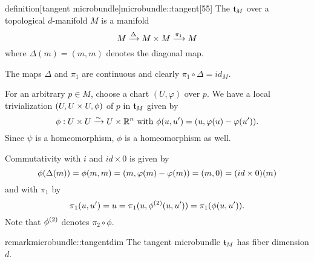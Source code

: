 \begin{mystatement}{definition}[tangent microbundle]{microbundle::tangent}[55]
    The  $\mathfrak{t}_M$ over
    a topological $d$-manifold $M$ is a manifold
    \[ M \xrightarrow{\Delta} M \times M \xrightarrow{\pi_1} M{} \]
    where $\Delta(m) = (m, m)$ denotes the diagonal map.
\end{mystatement}

\begin{myproof}
    The maps $\Delta$ and $\pi_1$ are continuous and clearly $\pi_1 \circ \Delta = id_M$.

    For an arbitrary $p \in M$,
    choose a chart $(U, \varphi)$ over $p$.
    We have a local trivialization $(U, U \times U, \phi)$ of $p$ in $\mathfrak{t}_M$ given by
    \[ \phi: U \times U \xrightarrow{\sim} U \times \mathbb{R}^n \text{ with } \phi(u, u') = (u, \varphi(u) - \varphi(u')). \]
    Since $\psi$ is a homeomorphism, $\phi$ is a homeomorphism as well.
    
    Commutativity with $i$ and $id \times 0$ is given by
    \[ \phi(\Delta(m)) = \phi(m, m) = (m, \varphi(m) - \varphi(m)) = (m, 0) = (id \times 0)(m)\]
    and with $\pi_1$ by
    \[ \pi_1(u, u') = u = \pi_1(u, \phi^{(2)}(u, u')) = \pi_1(\phi(u, u')). \]
    Note that $\phi^{(2)}$ denotes $\pi_2 \circ \phi$.
\end{myproof}

\begin{mystatement}{remark}{microbundle::tangentdim}
    The tangent microbundle $\mathfrak{t}_M$ has fiber dimension $d$.
\end{mystatement}